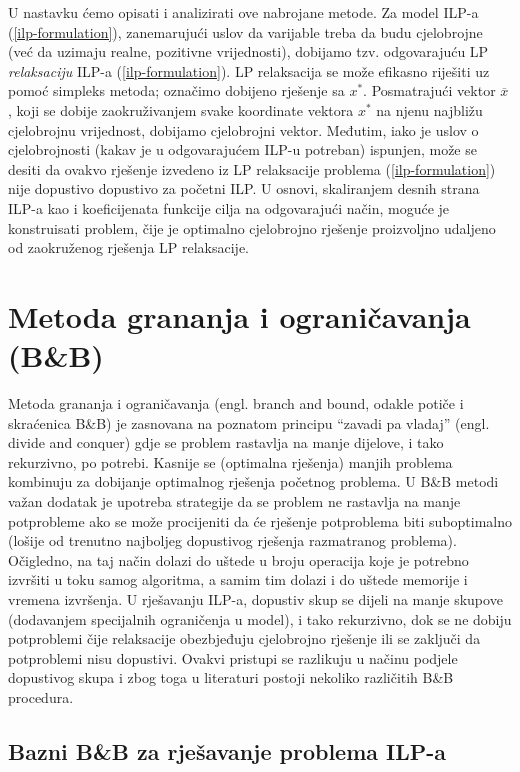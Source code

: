 \documentclass[a4paper, utf8, 11pt, colorlinks]{book}
\begin{document}
U nastavku ćemo opisati i analizirati ove nabrojane metode. Za model ILP-a (\ref{ilp-formulation}), zanemarujući uslov da varijable treba da budu cjelobrojne (već da uzimaju realne, pozitivne vrijednosti), dobijamo tzv. odgovarajuću LP \emph{relaksaciju} ILP-a (\ref{ilp-formulation}). LP relaksacija se može efikasno riješiti uz pomoć simpleks metoda; označimo dobijeno rješenje sa $x^*$. Posmatrajući vektor $\overline{x}$, koji se dobije zaokruživanjem svake koordinate vektora $x^*$ na njenu najbližu cjelobrojnu vrijednost, dobijamo cjelobrojni vektor. Međutim, iako je uslov o cjelobrojnosti (kakav je u odgovarajućem ILP-u potreban) ispunjen, može se desiti da ovakvo rješenje izvedeno iz LP relaksacije problema (\ref{ilp-formulation}) nije dopustivo dopustivo za početni ILP. U osnovi, skaliranjem desnih strana ILP-a kao i koeficijenata funkcije cilja na odgovarajući način, moguće je konstruisati problem, čije je optimalno cjelobrojno rješenje proizvoljno udaljeno od zaokruženog rješenja LP relaksacije.

\section{Metoda grananja i ograničavanja (B\&B)}
Metoda grananja i ograničavanja (engl. branch and bound, odakle potiče i skraćenica B\&B) je zasnovana na poznatom principu ``zavadi pa vladaj'' (engl. divide and conquer) gdje se problem rastavlja na manje dijelove, i tako rekurzivno, po potrebi. Kasnije se (optimalna rješenja) manjih problema kombinuju za dobijanje optimalnog rješenja početnog problema.  U B\&B metodi važan dodatak je upotreba strategije da se 
problem ne rastavlja na manje potprobleme ako se može procijeniti da će rješenje potproblema biti suboptimalno (lošije od trenutno najboljeg dopustivog rješenja razmatranog problema). Očigledno, na taj način dolazi do uštede u broju operacija koje je potrebno izvršiti u toku samog algoritma, a samim tim dolazi i do uštede memorije i vremena izvršenja. U rješavanju ILP-a, dopustiv skup se dijeli na manje skupove (dodavanjem specijalnih ograničenja u model), i tako rekurzivno,  dok se ne dobiju potproblemi čije relaksacije obezbjeđuju cjelobrojno rješenje ili se zaključi da potproblemi nisu dopustivi. Ovakvi pristupi se razlikuju u načinu podjele dopustivog skupa i zbog toga  u literaturi  postoji nekoliko različitih B\&B procedura. 

\subsection{Bazni B\&B za rješavanje problema ILP-a}
\end{document}
